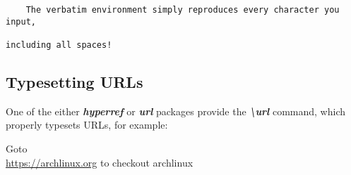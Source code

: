 \documentclass[12pt,a4paper,oneside]{article}
\newcommand{\oops}[1]{\textbf{\textit{#1}}}
\begin{document}
\begin{verbatim}
	The verbatim environment simply reproduces every character you input,

including all spaces!
\end{verbatim}

\subsection{Typesetting URLs}

One of the either \oops{hyperref} or \oops{url} packages provide the \oops{\textbackslash{}url} command, which properly typesets URLs, for example:

\noindent Goto\\
\url{https://archlinux.org} to checkout archlinux
\end{document}
